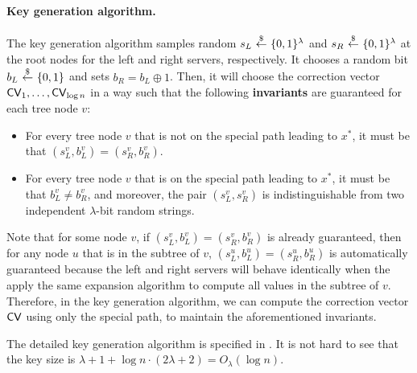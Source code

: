\paragraph{Key generation algorithm.}
The key generation algorithm samples  
random $s_L ~{\overset{\$}{\leftarrow}}~ \{0, 1\}^\lambda$ and $s_R ~{\overset{\$}{\leftarrow}}~ \{0, 1\}^\lambda$ 
at the root nodes for the left and right servers, respectively.
It chooses a random bit $b_L ~{\overset{\$}{\leftarrow}}~\{0, 1\}$ 
and sets $b_R = b_L \oplus 1$.
Then, it will choose the correction vector ${\sf CV}_1, \ldots, {\sf CV}_{\log n}$
in a way such that 
the following {\bf invariants} are guaranteed for each
tree node $v$:

\begin{itemize}[leftmargin=7mm]
\item 
For every tree node $v$
that is not on the special path leading to $x^*$, 
it must be that $(s_L^v, b_L^v) = (s_R^v, b_R^v)$.
\item 
For every tree node $v$
that is on the special path leading to $x^*$, 
it must be that $b_L^v \neq b_R^v$,
and moreover, the pair $(s_L^v, s_R^v)$ 
is indistinguishable from two independent $\lambda$-bit random 
strings.
\end{itemize}

Note that for some node $v$, if 
$(s_L^v, b_L^v) = (s_R^v, b_R^v)$
is already guaranteed, then 
for any node $u$ that is in the 
subtree of $v$,  
$(s_L^u, b_L^u) = (s_R^u, b_R^u)$
is automatically guaranteed because
the left and right servers
will behave identically when the apply the same 
expansion algorithm to compute 
all values in the subtree of $v$.
Therefore, in the key generation algorithm, 
we can compute the correction vector ${\sf CV}$
using only the special path, to maintain
the aforementioned invariants. 

The detailed key generation algorithm is specified
in .
It is not hard to see that 
the key size is $\lambda+1+\log n\cdot (2\lambda+2)=O_\lambda(\log n)$.






